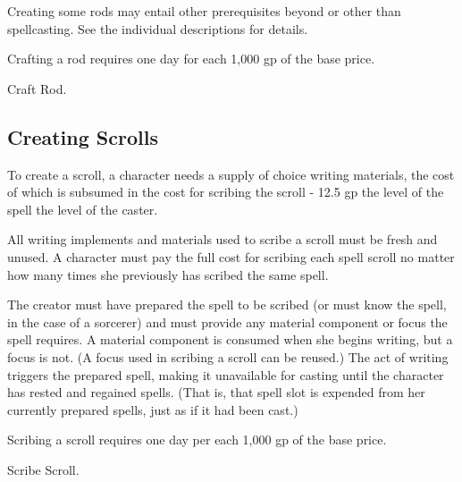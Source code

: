Creating some rods may entail other prerequisites beyond or other than spellcasting. See the individual descriptions for details.

Crafting a rod requires one day for each 1,000 gp of the base price.

 Craft Rod.

\subsection{Creating Scrolls}

To create a scroll, a character needs a supply of choice writing materials, the cost of which is subsumed in the cost for scribing the scroll - 12.5 gp \x the level of the spell \x the level of the caster.

All writing implements and materials used to scribe a scroll must be fresh and unused. A character must pay the full cost for scribing each spell scroll no matter how many times she previously has scribed the same spell.

The creator must have prepared the spell to be scribed (or must know the spell, in the case of a sorcerer) and must provide any material component or focus the spell requires. A material component is consumed when she begins writing, but a focus is not. (A focus used in scribing a scroll can be reused.) The act of writing triggers the prepared spell, making it unavailable for casting until the character has rested and regained spells. (That is, that spell slot is expended from her currently prepared spells, just as if it had been cast.)

Scribing a scroll requires one day per each 1,000 gp of the base price.

 Scribe Scroll.


